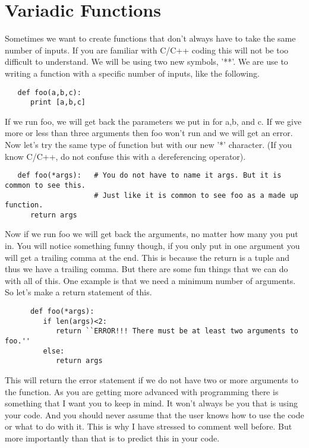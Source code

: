 \documentclass[11pt]{article}   %
\begin{document}
\section*{Variadic Functions}
Sometimes we want to create functions that don't always have to take the same number of inputs.  If you are familiar with C/C++ coding this will not be too difficult to understand.  We will be using two new symbols, '**'.
We are use to writing a function with a specific number of inputs, like the following.
\begin{tcolorbox}
   \begin{lstlisting}
   def foo(a,b,c):
      print [a,b,c]
   \end{lstlisting}
\end{tcolorbox}
If we run foo, we will get back the parameters we put in for a,b, and c.  If we give more or less than three arguments then foo won't run and we will get an error. Now let's try the same type of function but with our new '*' character.
(If you know C/C++, do not confuse this with a dereferencing operator).  
\begin{tcolorbox}
   \begin{lstlisting}
   def foo(*args):   # You do not have to name it args. But it is common to see this.
                     # Just like it is common to see foo as a made up function.
      return args
   \end{lstlisting}
\end{tcolorbox}
Now if we run foo we will get back the arguments, no matter how many you put in.  You will notice something funny though, if you only put in one argument you will get a trailing comma at the end. This is because the return is a 
tuple and thus we have a trailing comma.  But there are some fun things that we can do with all of this.  One example is that we need a minimum number of arguments.  So let's make a return statement of this.
\begin{tcolorbox}
   \begin{lstlisting}
      def foo(*args):
         if len(args)<2:
            return ``ERROR!!! There must be at least two arguments to foo.''
         else:
            return args
   \end{lstlisting}
\end{tcolorbox}
This will return the error statement if we do not have two or more arguments to the function.  As you are getting more advanced with programming there is something that I want you to keep in mind.  It won't always be you that is 
using your code.  And you should never assume that the user knows how to use the code or what to do with it.  This is why I have stressed to comment well before.  But more importantly than that is to predict this in your code.
\end{document}
